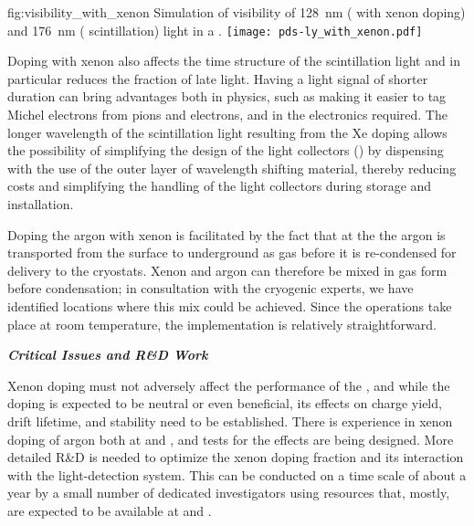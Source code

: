 \begin{dunefigure}
{fig:visibility_with_xenon}
{Simulation of visibility of \SI{128}{nm} ( with xenon doping) and \SI{176}{nm} ( scintillation) light in a .}
\texttt{[image: pds-ly\_with\_xenon.pdf]}
\end{dunefigure}

Doping with xenon also affects the time structure of the scintillation light and in particular reduces the fraction of late light.  Having a light signal of shorter duration can bring advantages both in physics, such as making it easier to tag Michel electrons from pions and electrons, and in the electronics required. The longer wavelength of the scintillation light resulting from the Xe doping allows the possibility of simplifying the design of the  light collectors () by dispensing with the use of the outer layer of wavelength shifting material, thereby reducing costs and simplifying the handling of the light collectors during storage and installation. 


Doping the argon with xenon is facilitated by the fact that at the   the argon is transported from the surface to underground as gas before it is re-condensed for delivery to the cryostats. Xenon and argon can therefore be mixed in gas form before condensation;  in consultation with the cryogenic experts, we have identified locations where this mix could be achieved. Since the operations take place at room temperature, the implementation is relatively straightforward.

{\it\bf Critical Issues and R\&D Work}

Xenon doping must not adversely affect the performance of the , and while the doping is expected to be neutral or even beneficial, its effects on charge yield, drift lifetime, and  stability need to be established.  There is experience in xenon doping of argon both at  and , and tests for the  effects are being designed.  
More detailed R\&D is needed to optimize the xenon doping fraction and its interaction with the light-detection system. This can be conducted on a time scale of about a year by a small number of dedicated investigators using resources that, mostly, are expected to be available at  and . 

